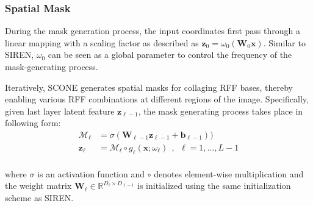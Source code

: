 \documentclass[letterpaper]{article} %
\newcommand{\mat}[1]{\bm{#1}}
\begin{document}
\subsubsection{Spatial Mask}
\label{subsubsec:method_mask}


During the mask generation process, the input coordinates first pass through a linear mapping with a scaling factor as described as $\mathbf{z}_{0} = \omega_0 (\mat{W}_{0}\mathbf{x})$. Similar to SIREN, $\omega_0$ can be seen as a global parameter to control the frequency of the mask-generating process.

Iteratively, SCONE generates spatial masks for collaging RFF bases, thereby enabling various RFF combinations at different regions of the image. Specifically, given last layer latent feature $\mathbf{z}_{\ell-1}$, the mask generating process takes place in following form:
\begin{equation}
    \begin{aligned}
         \mathcal{M}_{\ell} &=\sigma(\mat{W}_{\ell-1}\mathbf{z}_{\ell-1} + \mathbf{b}_{\ell-1})) \\
         \mathbf{z}_{\ell} &=  \mathcal{M}_{\ell} \circ g_{\ell}(\mathbf{x};\omega_{\ell})    \ \ , \ \ \ell = 1, ... , L-1 \\
    \end{aligned}%
\end{equation}%


\noindent where $\sigma$ is an activation function and $\circ$ denotes element-wise multiplication and the weight matrix $\mat{W}_{\ell}\in\mathbb{R}^{D_{\ell}\times D_{\ell-1}}$ is initialized using the same initialization scheme as SIREN.

\end{document}

